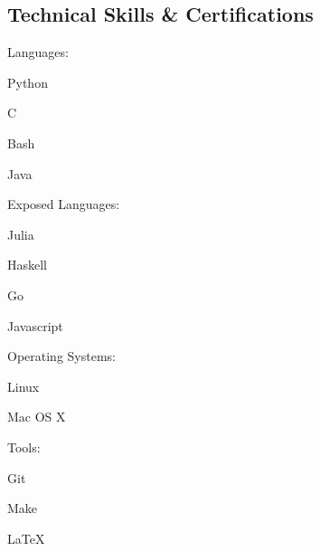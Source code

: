 \documentclass[a4paper,margin,line]{resume}
\begin{document}
\begin{resume}
\section{\mysidestyle Technical Skills \& Certifications}
	\begin{compactdesc}
		\item[Languages: ] \begin{inparaenum} { \small
			\item Python
            \item C
			\item Bash
			\item Java
		} \end{inparaenum}
        \item[Exposed Languages: ] \begin{inparaenum}{ \small
            \item Julia
            \item Haskell
            \item Go
            \item Javascript
        } \end{inparaenum}
		\item[Operating Systems: ] \begin{inparaenum} { \small
            \item Linux 
			\item Mac OS X
		} \end{inparaenum}
		\item[Tools: ] \begin{inparaenum} { \small
            \item Git
			\item Make
			\item \LaTeX
		} \end{inparaenum}
	\end{compactdesc}


\end{resume}
\end{document}
